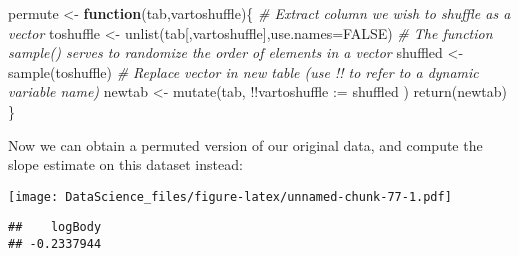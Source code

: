 \documentclass[
]{book}
\newenvironment{Shaded}{\begin{snugshade}}{\end{snugshade}}
\newcommand{\AttributeTok}[1]{\textcolor[rgb]{0.77,0.63,0.00}{#1}}
\newcommand{\CommentTok}[1]{\textcolor[rgb]{0.56,0.35,0.01}{\textit{#1}}}
\newcommand{\ConstantTok}[1]{\textcolor[rgb]{0.00,0.00,0.00}{#1}}
\newcommand{\ControlFlowTok}[1]{\textcolor[rgb]{0.13,0.29,0.53}{\textbf{#1}}}
\newcommand{\DecValTok}[1]{\textcolor[rgb]{0.00,0.00,0.81}{#1}}
\newcommand{\FunctionTok}[1]{\textcolor[rgb]{0.00,0.00,0.00}{#1}}
\newcommand{\NormalTok}[1]{#1}
\newcommand{\OtherTok}[1]{\textcolor[rgb]{0.56,0.35,0.01}{#1}}
\newcommand{\SpecialCharTok}[1]{\textcolor[rgb]{0.00,0.00,0.00}{#1}}
\newcommand{\StringTok}[1]{\textcolor[rgb]{0.31,0.60,0.02}{#1}}
\begin{document}
\begin{Shaded}
\begin{Highlighting}[]
\NormalTok{permute }\OtherTok{\textless{}{-}} \ControlFlowTok{function}\NormalTok{(tab,vartoshuffle)\{}
  \CommentTok{\# Extract column we wish to shuffle as a vector}
\NormalTok{  toshuffle }\OtherTok{\textless{}{-}} \FunctionTok{unlist}\NormalTok{(tab[,vartoshuffle],}\AttributeTok{use.names=}\ConstantTok{FALSE}\NormalTok{)}
  \CommentTok{\# The function sample() serves to randomize the order of elements in a vector}
\NormalTok{  shuffled }\OtherTok{\textless{}{-}} \FunctionTok{sample}\NormalTok{(toshuffle)}
  \CommentTok{\# Replace vector in new table (use !! to refer to a dynamic variable name)}
\NormalTok{  newtab }\OtherTok{\textless{}{-}} \FunctionTok{mutate}\NormalTok{(tab, }\SpecialCharTok{!!}\AttributeTok{vartoshuffle :=}\NormalTok{ shuffled )}
  \FunctionTok{return}\NormalTok{(newtab)}
\NormalTok{\}}
\end{Highlighting}
\end{Shaded}

Now we can obtain a permuted version of our original data, and compute the slope estimate on this dataset instead:

\begin{Shaded}
\end{Shaded}

\texttt{[image: DataScience\_files/figure-latex/unnamed-chunk-77-1.pdf]}

\begin{Shaded}
\end{Shaded}

\begin{verbatim}
##    logBody 
## -0.2337944
\end{verbatim}
\end{document}
